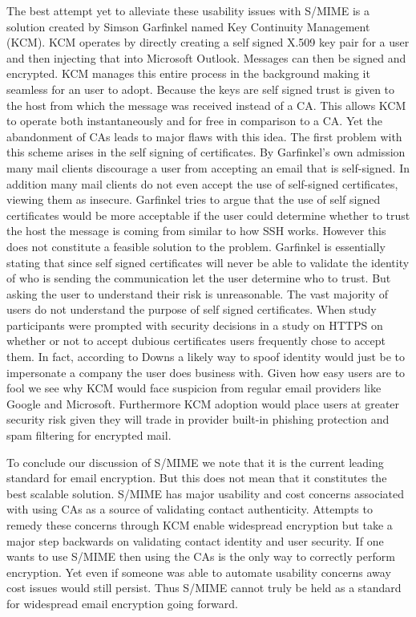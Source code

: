 \documentclass{article}
\begin{document}
\par The best attempt yet to alleviate these usability issues with S/MIME is a solution created by Simson Garfinkel named Key Continuity Management (KCM). KCM operates by directly creating a self signed X.509 key pair for a user and then injecting that into Microsoft Outlook. Messages can then be signed and encrypted. KCM manages this entire process in the background making it seamless for an user to adopt. Because the keys are self signed trust is given to the host from which the message was received instead of a CA\cite{garfinkel2005johnny}. This allows KCM to operate both instantaneously and for free in comparison to a CA. Yet the abandonment of CAs leads to major flaws with this idea. The first problem with this scheme arises in the self signing of certificates. By Garfinkel's own admission many mail clients discourage a user from accepting an email that is self-signed\cite{garfinkel2005make}. In addition many mail clients do not even accept the use of self-signed certificates, viewing them as insecure\cite{force-use-of-self,ars-postfix}. Garfinkel tries to argue that the use of self signed certificates would be more acceptable if the user could determine whether to trust the host the message is coming from similar to how SSH works\cite{garfinkel2005make}. However this does not constitute a feasible solution to the problem. Garfinkel is essentially stating that since self signed certificates will never be able to validate the identity of who is sending the communication\cite{furnell2013usable} let the user determine who to trust. But asking the user to understand their risk is unreasonable. The vast majority of users do not understand the purpose of self signed certificates\cite{downs2006decision}. When study participants were prompted with security decisions in a study on HTTPS on whether or not to accept dubious certificates users frequently chose to accept them\cite{callegati2009man}. In fact, according to Downs a likely way to spoof identity would just be to impersonate a company the user does business with\cite{downs2006decision}. Given how easy users are to fool we see why KCM would face suspicion from regular email providers like Google and Microsoft. Furthermore KCM adoption would place users at greater security risk given they will trade in provider built-in phishing protection and spam filtering for encrypted mail.
\par To conclude our discussion of S/MIME we note that it is the current leading standard for email encryption. But this does not mean that it constitutes the best scalable solution. S/MIME has major usability and cost concerns associated with using CAs as a source of validating contact authenticity. Attempts to remedy these concerns through KCM enable widespread encryption but take a major step backwards on validating contact identity and user security. If one wants to use S/MIME then using the CAs is the only way to correctly perform encryption. Yet even if someone was able to automate usability concerns away cost issues would still persist. Thus S/MIME cannot truly be held as a standard for widespread email encryption going forward.
\end{document}
